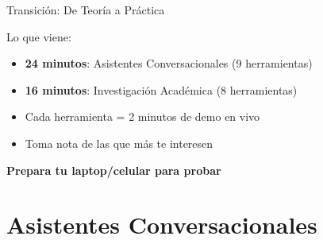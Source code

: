 \documentclass[aspectratio=169,xcolor={dvipsnames}]{beamer}
\begin{document}
	\begin{frame}{Transición: De Teoría a Práctica}
		
		\begin{center}
		\end{center}
		
		\vspace{0.5cm}
		
		\begin{block}{Lo que viene:}
			\begin{itemize}
				\item \textbf{24 minutos}: Asistentes Conversacionales (9 herramientas)
				\item \textbf{16 minutos}: Investigación Académica (8 herramientas)
				\item Cada herramienta = 2 minutos de demo en vivo
				\item Toma nota de las que más te interesen
			\end{itemize}
		\end{block}
		
		\vspace{0.3cm}
		\centering
		{\large \textbf{Prepara tu laptop/celular para probar}}
		
	\end{frame}
	
	
	\section{Asistentes Conversacionales}
	
\end{document}
